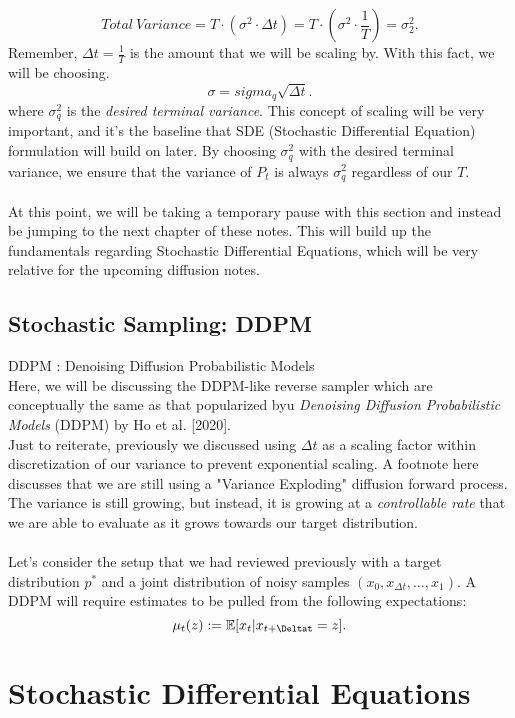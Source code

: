\documentclass[10pt, oneside]{report}
\newcommand{\E}{\mathbb{E}}
\begin{document}
\[
Total\ Variance = T \cdot (\sigma^2 \cdot \Delta t) = T \cdot (\sigma^2 \cdot \frac{1}{T}) = \sigma^2_2
.\] 
Remember, $\Delta t =  \frac{1}{T}$ is the amount that we will be scaling by.  With this fact, we will be choosing. \[
    \sigma = sigma_q\sqrt{\Delta t}
.\] where $\sigma^2_q$ is the \textit{desired terminal variance}.  This concept of  scaling will be very important, and it's the baseline that SDE (Stochastic Differential Equation) formulation will build on later. By choosing $\sigma^2_q$ with the desired terminal variance, we ensure that the variance of $P_t$ is always $\sigma^2_q$ regardless of our $T$.
\\
\\
At this point, we will be taking a temporary pause with this section and instead be jumping to the next chapter of these notes.  This will build up the fundamentals regarding Stochastic Differential Equations, which will be very relative for the upcoming diffusion notes. 

\section{Stochastic Sampling: DDPM}
DDPM : Denoising Diffusion Probabilistic Models\\

Here, we will be discussing the DDPM-like reverse sampler which are conceptually the same as that popularized byu \textit{Denoising Diffusion Probabilistic Models} (DDPM) by Ho et al. [2020].\\
Just to reiterate, previously we discussed using $\Delta t$ as a scaling factor within discretization of our variance to prevent exponential scaling.  A footnote here discusses that we are still using a "Variance Exploding" diffusion forward process.  The variance is still growing, but instead, it is growing at a \textit{controllable rate} that we are able to evaluate as it grows towards our target distribution. \\
\\
Let's consider the setup that we had reviewed previously with a target distribution $p^*$ and a joint distribution of noisy samples $(x_0, x_{\Delta t}, \ldots, x_1)$.  A DDPM will require estimates to be pulled from the following expectations:
\[
    \mu_t (z) : = \E[x_t | x_{t+\Deltat} = z]
.\] 



\chapter{Stochastic Differential Equations}
\end{document}
